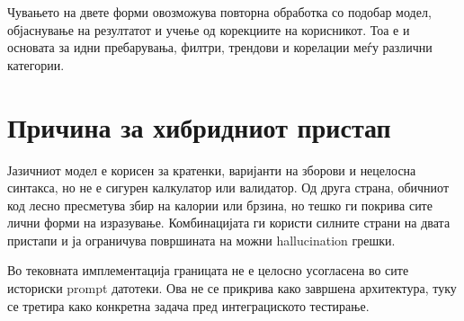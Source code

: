 Чувањето на двете форми овозможува повторна обработка со подобар модел, објаснување на резултатот и учење од корекциите на корисникот.
Тоа е и основата за идни пребарувања, филтри, трендови и корелации меѓу различни категории.

\section{Причина за хибридниот пристап}

Јазичниот модел е корисен за кратенки, варијанти на зборови и нецелосна синтакса, но не е сигурен калкулатор или валидатор.
Од друга страна, обичниот код лесно пресметува збир на калории или брзина, но тешко ги покрива сите лични форми на изразување.
Комбинацијата ги користи силните страни на двата пристапи и ја ограничува површината на можни hallucination грешки.

Во тековната имплементација границата не е целосно усогласена во сите историски prompt датотеки.
Ова не се прикрива како завршена архитектура, туку се третира како конкретна задача пред интеграциското тестирање.
